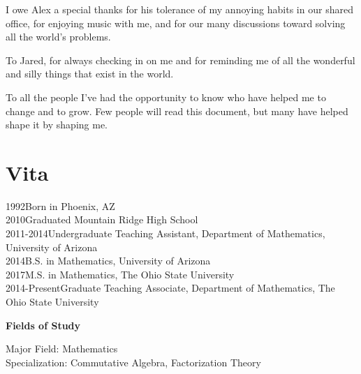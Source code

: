 I owe Alex a special thanks for his tolerance of my annoying habits in our shared office, for enjoying music with me, and for our many discussions toward solving all the world's problems.

To Jared, for always checking in on me and for reminding me of all the wonderful and silly things that exist in the world.

To all the people I've had the opportunity to know who have helped me to change and to grow.
Few people will read this document, but many have helped shape it by shaping me.






\chapter{Vita}
1992\dotfill  Born in Phoenix, AZ \\
2010\dotfill Graduated Mountain Ridge High School \\
2011-2014\dotfill Undergraduate Teaching Assistant, Department of Mathematics, University of Arizona  \\
2014\dotfill B.S. in Mathematics, University of Arizona \\
2017\dotfill M.S. in Mathematics, The Ohio State University \\
2014-Present\dotfill Graduate Teaching Associate, Department of Mathematics, The Ohio State University \\

\begin{center}
{ \LARGE \bf Fields of Study}
\end{center}
Major Field: Mathematics\\
Specialization: Commutative Algebra, Factorization Theory